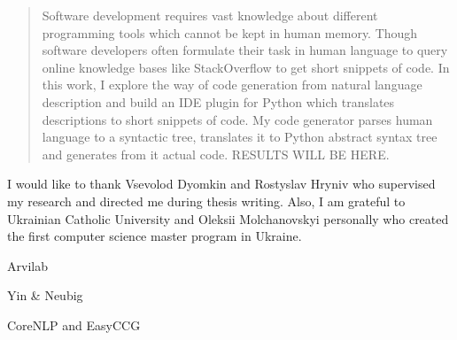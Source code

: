 \documentclass[
12pt, %
oneside, %
english, %
onehalfspacing, %
nolistspacing, %
liststotoc, %
parskip, %
headsepline, %
]{MastersDoctoralThesis} %
\begin{document}
\cleardoublepage




\begin{abstract}
\addchaptertocentry{\abstractname} %
Software development requires vast knowledge about different programming tools which cannot be kept in human memory. Though software developers often formulate their task in human language to query online knowledge bases like StackOverflow to get short snippets of code. In this work, I explore the way of code generation from natural language description and build an IDE plugin for Python which translates descriptions to short snippets of code. My code generator parses human language to a syntactic tree, translates it to Python abstract syntax tree and generates from it actual code. RESULTS WILL BE HERE.
\end{abstract}


\begin{acknowledgements}
\addchaptertocentry{\acknowledgementname} %
I would like to thank Vsevolod Dyomkin and Rostyslav Hryniv who supervised my research and directed me during thesis writing. Also, I am grateful to Ukrainian Catholic University and Oleksii  Molchanovskyi personally who created the first computer science master program in Ukraine. 

Arvilab

Yin & Neubig

CoreNLP and EasyCCG
\end{acknowledgements}


\tableofcontents %
\end{document}
